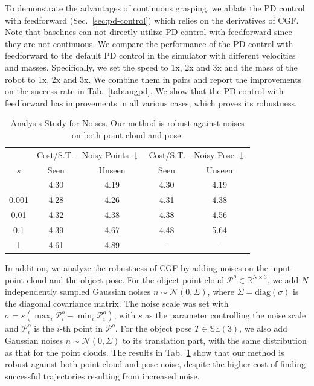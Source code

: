 \documentclass[letterpaper, 10 pt, journal, twoside]{IEEEtran}
\newcommand{\tablestyle}[2]{\setlength{\tabcolsep}{#1}\renewcommand{\arraystretch}{#2}\centering\footnotesize}
\begin{document}
To demonstrate the advantages of continuous grasping, we ablate the PD control with feedforward (Sec.~\ref{sec:pd-control}) which relies on the derivatives of CGF. Note that baselines can not directly utilize PD control with feedforward since they are not continuous. We compare the performance of the PD control with feedforward to the default PD control in the simulator with different velocities and masses. Specifically, we set the speed to 1x, 2x and 3x and the mass of the robot to 1x, 2x and 3x. We combine them in pairs and report the improvements on the success rate in Tab.~\ref{tab:augpd}. We show that the PD control with feedforward has improvements in all various cases, which proves its robustness.


\begin{table}[t]
    \centering
    \tablestyle{1.5pt}{1.05}
    \begin{tabular}{c|cc|cc}
         & \multicolumn{2}{c}{Cost/S.T. - Noisy Points $\downarrow$} & \multicolumn{2}{c}{Cost/S.T. - Noisy Pose $\downarrow$} \\
        $s$ & Seen & Unseen & Seen & Unseen \\
        \shline
        0 & 4.30 & 4.19 & 4.30 & 4.19 \\
        0.001 & 4.28 & 4.26 & 4.31 & 4.38 \\
        0.01 & 4.32 & 4.38 & 4.38 & 4.56 \\
        0.1 & 4.39 & 4.67 & 4.48 & 5.64 \\
        1 & 4.61 & 4.89 & - & - \\
    \end{tabular}
    \vspace{-0.1in}
    \caption{\small
    Analysis Study for Noises. Our method is robust against noises on both point cloud and pose.
    }
    \vspace{-0.15in}
\label{tab:noise}
\end{table}


In addition, we analyze the robustness of CGF by adding noises on the input point cloud and the object pose. For the object point cloud $\mathcal{P}^{o} \in \mathbb{R}^{N \times 3}$, we add $N$ independently sampled Gaussian noises $n \sim \mathcal{N}(0, \Sigma)$, where $\Sigma = \text{diag}(\sigma)$ is the diagonal covariance matrix. The noise scale was set with $\sigma = s \left( \max_i{\mathcal{P}^{o}_i} - \min_i{\mathcal{P}^{o}_i} \right)$, with $s$ as the parameter controlling the noise scale and $\mathcal{P}^{o}_i$ is the $i$-th point in $\mathcal{P}^{o}$. For the object pose $T \in \mathbb{S E}(3)$, we also add Gaussian noises $n \sim \mathcal{N}(0, \Sigma)$ to its translation part, with the same distribution as that for the point clouds. The results in Tab.~\ref{tab:noise} show that our method is robust against both point cloud and pose noise, despite the higher cost of finding successful trajectories resulting from increased noise.
\end{document}
